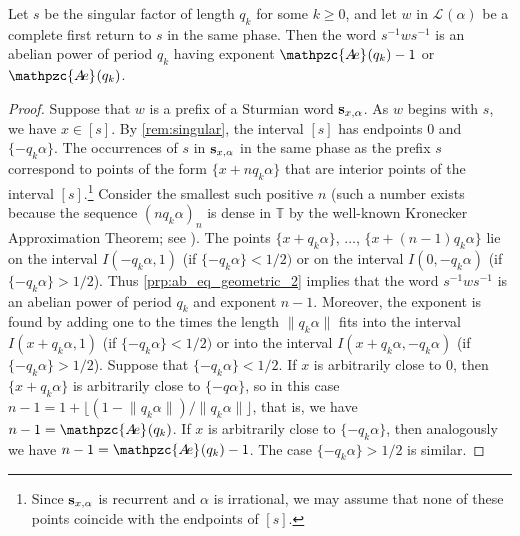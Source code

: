 \documentclass[a4paper,fleqn]{article}
\providecommand{\norm}[1]{\lVert#1\rVert}
\providecommand{\floor}[1]{\lfloor#1\rfloor}
\newcommand{\Lang}[2][]{\mathcal{L}_{#1}(#2)}
\newcommand{\infw}[1]{%
  \ifcat\noexpand#1\relax\bm{#1}%
  \else\mathbf{#1}\fi}          %
\newcommand{\abexp}[2][]{\mathpzc{A\mkern-3mu e}_{#1}(#2)}
\newcommand{\T}{\mathbb{T}}
\begin{document}
  \begin{lemma}\label{lem:covering}
    Let $s$ be the singular factor of length $q_k$ for some $k \geq 0$, and let $w$ in $\Lang{\alpha}$ be a complete
    first return to $s$ in the same phase. Then the word $s^{-1}ws^{-1}$ is an abelian power of period $q_k$ having
    exponent $\abexp{q_k} - 1$ or $\abexp{q_k}$.
  \end{lemma}
  \begin{proof}
    Suppose that $w$ is a prefix of a Sturmian word $\infw{s}_{x,\alpha}$. As $w$ begins with $s$, we have $x \in [s]$.
    By \autoref{rem:singular}, the interval $[s]$ has endpoints $0$ and $\{-q_k\alpha\}$. The occurrences of $s$ in
    $\infw{s}_{x,\alpha}$ in the same phase as the prefix $s$ correspond to points of the form $\{x + nq_k \alpha\}$
    that are interior points of the interval $[s]$.\footnote{Since $\infw{s}_{x,\alpha}$ is recurrent and $\alpha$ is
    irrational, we may assume that none of these points coincide with the endpoints of $[s]$.} Consider the smallest
    such positive $n$ (such a number exists because the sequence $(nq_k\alpha)_n$ is dense in $\T$ by the well-known
    Kronecker Approximation Theorem; see \cite[Ch.~XXIII]{1979:an_introduction_to_the_theory_of_numbers}). The points
    $\{x + q_k\alpha\}$, $\ldots$, $\{x + (n - 1)q_k\alpha\}$ lie on the interval $I(-q_k\alpha, 1)$ (if
    $\{-q_k\alpha\} < 1/2)$ or on the interval $I(0, -q_k\alpha)$ (if $\{-q_k\alpha\} > 1/2$). Thus
    \autoref{prp:ab_eq_geometric_2} implies that the word $s^{-1}ws^{-1}$ is an abelian power of period $q_k$ and
    exponent $n - 1$. Moreover, the exponent is found by adding one to the times the length $\norm{q_k\alpha}$ fits
    into the interval $I(x + q_k\alpha, 1)$ (if $\{-q_k\alpha\} < 1/2)$ or into the interval
    $I(x + q_k\alpha, -q_k\alpha)$ (if $\{-q_k\alpha\} > 1/2$). Suppose that $\{-q_k\alpha\} < 1/2$. If $x$ is
    arbitrarily close to $0$, then $\{x + q_k\alpha\}$ is arbitrarily close to $\{-q\alpha\}$, so in this case
    $n - 1 = 1 + \floor{(1 - \norm{q_k\alpha})/\norm{q_k\alpha}}$, that is, we have $n - 1 = \abexp{q_k}$. If $x$ is
    arbitrarily close to $\{-q_k\alpha\}$, then analogously we have $n - 1 = \abexp{q_k} - 1$. The case
    $\{-q_k\alpha\} > 1/2$ is similar.
  \end{proof}
\end{document}
